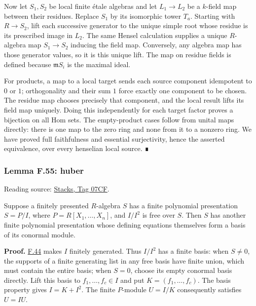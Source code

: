\documentclass[11pt,a4paper,openany]{report}
\newcounter{none}
\begin{document}
Now let \(S_1,S_2\) be local finite étale algebras and let \(L_1\to L_2\) be a \(k\)-field map between their residues. Replace \(S_1\) by its isomorphic tower \(T_a\). Starting with \(R\to S_2\), lift each successive generator to the unique simple root whose residue is its prescribed image in \(L_2\). The same Hensel calculation supplies a unique \(R\)-algebra map \(S_1\to S_2\) inducing the field map. Conversely, any algebra map has those generator values, so it is this unique lift. The map on residue fields is defined because \(\mathfrak mS_i\) is the maximal ideal.

For products, a map to a local target sends each source component idempotent to \(0\) or \(1\); orthogonality and their sum \(1\) force exactly one component to be chosen. The residue map chooses precisely that component, and the local result lifts its field map uniquely. Doing this independently for each target factor proves a bijection on all Hom sets. The empty-product cases follow from unital maps directly: there is one map to the zero ring and none from it to a nonzero ring. We have proved full faithfulness and essential surjectivity, hence the asserted equivalence, over every henselian local source. ∎

\label{AG-RG-S05-algebra-lemma-huber}

\subsubsection{Lemma F.55: huber}\label{AG-RG-S05-lemma-f.55-huber}

Reading source: \href{https://stacks.math.columbia.edu/tag/07CF}{Stacks, Tag 07CF}.

Suppose a finitely presented \(R\)-algebra \(S\) has a finite polynomial presentation \(S=P/I\), where \(P=R[X_1,\ldots,X_n]\), and \(I/I^2\) is free over \(S\). Then \(S\) has another finite polynomial presentation whose defining equations themselves form a basis of its conormal module.

\textbf{Proof.} \hyperref[AG-RG-S05-algebra-lemma-finite-presentation-independent]{F.44} makes \(I\) finitely generated. Thus \(I/I^2\) has a finite basis: when \(S\ne0\), the supports of a finite generating list in any free basis have finite union, which must contain the entire basis; when \(S=0\), choose its empty conormal basis directly. Lift this basis to \(f_1,\ldots,f_c\in I\) and put \(K=(f_1,\ldots,f_c)\). The basis property gives \(I=K+I^2\). The finite \(P\)-module \(U=I/K\) consequently satisfies \(U=IU\).
\end{document}
